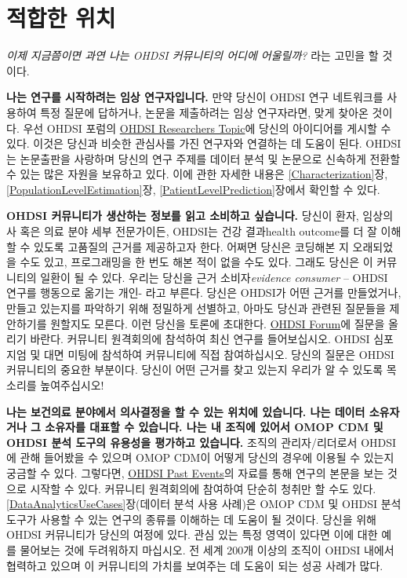 \documentclass[11pt]{book}
\theoremstyle{definition}
\theoremstyle{definition}
\theoremstyle{definition}
\theoremstyle{remark}
\begin{document}
\section{적합한 위치}\label{-}

\emph{이제 지금쯤이면 과연 나는 OHDSI 커뮤니티의 어디에 어울릴까?} 라는
고민을 할 것이다.

\textbf{나는 연구를 시작하려는 임상 연구자입니다.} 만약 당신이 OHDSI
연구 네트워크를 사용하여 특정 질문에 답하거나, 논문을 제출하려는 임상
연구자라면, 맞게 찾아온 것이다. 우선 OHDSI 포럼의
\href{https://forums.ohdsi.org/c/researchers}{OHDSI Researchers Topic}에
당신의 아이디어를 게시할 수 있다. 이것은 당신과 비슷한 관심사를 가진
연구자와 연결하는 데 도움이 된다. OHDSI는 논문출판을 사랑하며 당신의
연구 주제를 데이터 분석 및 논문으로 신속하게 전환할 수 있는 많은 자원을
보유하고 있다. 이에 관한 자세한 내용은 \ref{Characterization}장,
\ref{PopulationLevelEstimation}장, \ref{PatientLevelPrediction}장에서
확인할 수 있다.

\textbf{OHDSI 커뮤니티가 생산하는 정보를 읽고 소비하고 싶습니다.} 당신이
환자, 임상의사 혹은 의료 분야 세부 전문가이든, OHDSI는 건강 결과health
outcome를 더 잘 이해할 수 있도록 고품질의 근거를 제공하고자 한다. 어쩌면
당신은 코딩해본 지 오래되었을 수도 있고, 프로그래밍을 한 번도 해본 적이
없을 수도 있다. 그래도 당신은 이 커뮤니티의 일환이 될 수 있다. 우리는
당신을 근거 소비자\emph{evidence consumer} -- OHDSI 연구를 행동으로
옮기는 개인- 라고 부른다. 당신은 OHDSI가 어떤 근거를 만들었거나, 만들고
있는지를 파악하기 위해 정밀하게 선별하고, 아마도 당신과 관련된 질문들을
제안하기를 원할지도 모른다. 이런 당신을 토론에 초대한다.
\href{http://forum.ohdsi.org}{OHDSI Forum}에 질문을 올리기 바란다.
커뮤니티 원격회의에 참석하여 최신 연구를 들어보십시오. OHDSI 심포지엄 및
대면 미팅에 참석하여 커뮤니티에 직접 참여하십시오. 당신의 질문은 OHDSI
커뮤니티의 중요한 부분이다. 당신이 어떤 근거를 찾고 있는지 우리가 알 수
있도록 목소리를 높여주십시오!

\textbf{나는 보건의료 분야에서 의사결정을 할 수 있는 위치에 있습니다.
나는 데이터 소유자거나 그 소유자를 대표할 수 있습니다. 나는 내 조직에
있어서 OMOP CDM 및 OHDSI 분석 도구의 유용성을 평가하고 있습니다.} 조직의
관리자/리더로서 OHDSI에 관해 들어봤을 수 있으며 OMOP CDM이 어떻게 당신의
경우에 이용될 수 있는지 궁금할 수 있다. 그렇다면,
\href{https://www.ohdsi.org/past-events/}{OHDSI Past Events}의 자료를
통해 연구의 본문을 보는 것으로 시작할 수 있다. 커뮤니티 원격회의에
참여하여 단순히 청취만 할 수도 있다.
\ref{DataAnalyticsUseCases}장(데이터 분석 사용 사례)은 OMOP CDM 및 OHDSI
분석 도구가 사용할 수 있는 연구의 종류를 이해하는 데 도움이 될 것이다.
당신을 위해 OHDSI 커뮤니티가 당신의 여정에 있다. 관심 있는 특정 영역이
있다면 이에 대한 예를 물어보는 것에 두려워하지 마십시오. 전 세계 200개
이상의 조직이 OHDSI 내에서 협력하고 있으며 이 커뮤니티의 가치를 보여주는
데 도움이 되는 성공 사례가 많다.
\end{document}
